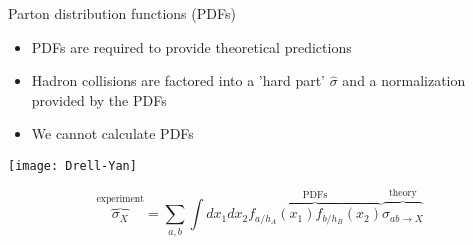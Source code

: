 \begin{frame}{Parton distribution functions (PDFs)}

\vspace*{\titleskip}

\begin{itemize}
	\item PDFs are required to provide theoretical predictions	

	\item Hadron collisions are factored into a 'hard part' $\hat{\sigma}$ and a normalization provided by the PDFs	
	
	\item We cannot calculate PDFs
	
	
	
\end{itemize}

\begin{center}

\texttt{[image: Drell-Yan]}

\vspace{-0.5cm}
$$ \overbrace{\sigma_X}^{\text{experiment}}=\sum_{a, b} \int d x_{1} d x_{2} \overbrace{ f_{a / h_{A}}\left(x_{1}\right) f_{b / h_{B}}\left(x_{2}\right)}^{\text{PDFs}} \overbrace{ \hat{\sigma}_{a b \rightarrow X}}^{\text{theory}} $$

\end{center}


\end{frame}


%
%
%

